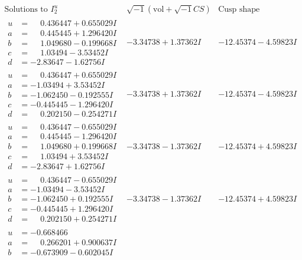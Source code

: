 \documentclass[1p]{elsarticle_modified}
\theoremstyle{definition}
\newcommand{\I}{\sqrt{-1}}
\begin{document}
$$\begin{array}{c|c|c}  
\text{Solutions to }I^u_{2}& \I (\text{vol} + \sqrt{-1}CS) & \text{Cusp shape}\\
 \hline 
\begin{aligned}
u &= \phantom{-}0.436447 + 0.655029 I \\
a &= \phantom{-}0.445445 + 1.296420 I \\
b &= \phantom{-}1.049680 - 0.199668 I \\
c &= \phantom{-}1.03494 - 3.53452 I \\
d &= -2.83647 - 1.62756 I\end{aligned}
 & -3.34738 + 1.37362 I & -12.45374 - 4.59823 I \\ \hline\begin{aligned}
u &= \phantom{-}0.436447 + 0.655029 I \\
a &= -1.03494 + 3.53452 I \\
b &= -1.062450 - 0.192555 I \\
c &= -0.445445 - 1.296420 I \\
d &= \phantom{-}0.202150 - 0.254271 I\end{aligned}
 & -3.34738 + 1.37362 I & -12.45374 - 4.59823 I \\ \hline\begin{aligned}
u &= \phantom{-}0.436447 - 0.655029 I \\
a &= \phantom{-}0.445445 - 1.296420 I \\
b &= \phantom{-}1.049680 + 0.199668 I \\
c &= \phantom{-}1.03494 + 3.53452 I \\
d &= -2.83647 + 1.62756 I\end{aligned}
 & -3.34738 - 1.37362 I & -12.45374 + 4.59823 I \\ \hline\begin{aligned}
u &= \phantom{-}0.436447 - 0.655029 I \\
a &= -1.03494 - 3.53452 I \\
b &= -1.062450 + 0.192555 I \\
c &= -0.445445 + 1.296420 I \\
d &= \phantom{-}0.202150 + 0.254271 I\end{aligned}
 & -3.34738 - 1.37362 I & -12.45374 + 4.59823 I \\ \hline\begin{aligned}
u &= -0.668466\phantom{ +0.000000I} \\
a &= \phantom{-}0.266201 + 0.900637 I \\
b &= -0.673909 - 0.602045 I \\

\end{aligned}
\end{array}$$
\end{document}
